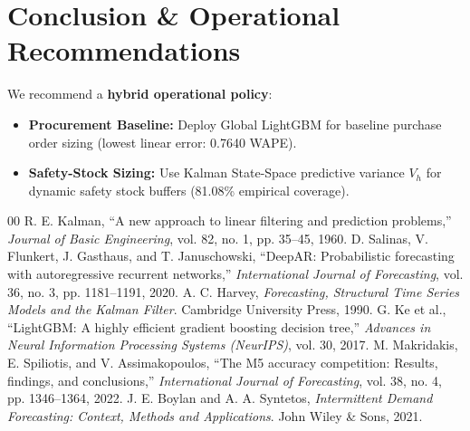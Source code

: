 \documentclass[11pt,a4paper]{article}
\begin{document}
\section{Conclusion \& Operational Recommendations}
We recommend a \textbf{hybrid operational policy}:
\begin{itemize}
    \item \textbf{Procurement Baseline:} Deploy Global LightGBM for baseline purchase order sizing (lowest linear error: 0.7640 WAPE).
    \item \textbf{Safety-Stock Sizing:} Use Kalman State-Space predictive variance $V_h$ for dynamic safety stock buffers (81.08\% empirical coverage).
\end{itemize}

\begin{thebibliography}{00}
 R. E. Kalman, ``A new approach to linear filtering and prediction problems,'' \textit{Journal of Basic Engineering}, vol. 82, no. 1, pp. 35--45, 1960.
 D. Salinas, V. Flunkert, J. Gasthaus, and T. Januschowski, ``DeepAR: Probabilistic forecasting with autoregressive recurrent networks,'' \textit{International Journal of Forecasting}, vol. 36, no. 3, pp. 1181--1191, 2020.
 A. C. Harvey, \textit{Forecasting, Structural Time Series Models and the Kalman Filter}. Cambridge University Press, 1990.
 G. Ke et al., ``LightGBM: A highly efficient gradient boosting decision tree,'' \textit{Advances in Neural Information Processing Systems (NeurIPS)}, vol. 30, 2017.
 M. Makridakis, E. Spiliotis, and V. Assimakopoulos, ``The M5 accuracy competition: Results, findings, and conclusions,'' \textit{International Journal of Forecasting}, vol. 38, no. 4, pp. 1346--1364, 2022.
 J. E. Boylan and A. A. Syntetos, \textit{Intermittent Demand Forecasting: Context, Methods and Applications}. John Wiley \& Sons, 2021.
\end{thebibliography}
\end{document}
